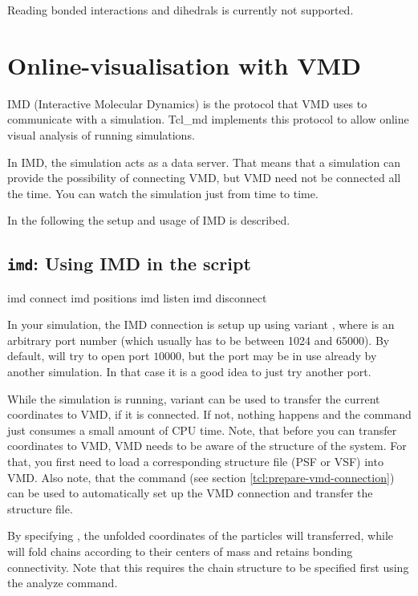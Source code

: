 Reading bonded interactions and dihedrals is currently not supported.

\section{Online-visualisation with VMD}
\label{sec:IMD}

IMD (Interactive Molecular Dynamics) is the protocol that VMD uses to
communicate with a simulation. Tcl\_md implements this protocol to
allow online visual analysis of running simulations.

In IMD, the simulation acts as a data server. That means that a
simulation can provide the possibility of connecting VMD, but VMD need
not be connected all the time. You can watch the simulation just from
time to time.

In the following the setup and usage of IMD is described.

\subsection{\texttt{imd}: Using IMD in the script}

\begin{essyntax}
   imd connect 
   imd positions 
   imd listen 
   imd disconnect
\end{essyntax}

In your simulation, the IMD connection is setup up using variant
, where  is an arbitrary port number (which
usually has to be between 1024 and 65000). By default, \es will try to
open port $10000$, but the port may be in use already by another \es
simulation. In that case it is a good idea to just try another port.

While the simulation is running, variant  can be used to
transfer the current coordinates to VMD, if it is connected.  If not,
nothing happens and the command just consumes a small amount of CPU
time. Note, that before you can transfer coordinates to VMD, VMD needs
to be aware of the structure of the system. For that, you first need
to load a corresponding structure file (PSF or VSF) into VMD. Also
note, that the command  (see section
\vref{tcl:prepare-vmd-connection}) can be used to automatically set up
the VMD connection and transfer the structure file.

By specifying , the unfolded coordinates of the
particles will transferred, while  will fold chains
according to their centers of mass and retains bonding connectivity.
Note that this requires the chain structure to be specified first
using the analyze command.

